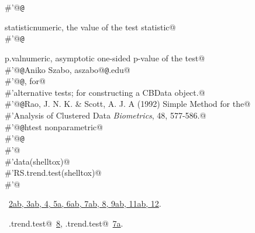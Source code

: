 \documentclass[reqno]{amsart}
\renewcommand{\NWlink}[2]{\hyperlink{#1}{#2}}
\begin{document}
\begin{flushleft}
\begin{list}{}{}
\mbox{}\verb@#'@{\tt @}\verb@return \item{statistic}{numeric, the value of the test statistic}@\\
\mbox{}\verb@#'@{\tt @}\verb@return \item{p.val}{numeric, asymptotic one-sided p-value of the test}@\\
\mbox{}\verb@#'@{\tt @}\verb@author Aniko Szabo, aszabo@{\tt @}\verb@mcw.edu@\\
\mbox{}\verb@#'@{\tt @}\verb@seealso {},  for@\\
\mbox{}\verb@#'alternative tests;  for constructing a CBData object.@\\
\mbox{}\verb@#'@{\tt @}\verb@references Rao, J. N. K. & Scott, A. J. A (1992) Simple Method for the@\\
\mbox{}\verb@#'Analysis of Clustered Data \emph{Biometrics}, 48, 577-586.@\\
\mbox{}\verb@#'@{\tt @}\verb@keywords htest nonparametric@\\
\mbox{}\verb@#'@{\tt @}\verb@examples@\\
\mbox{}\verb@#'@\\
\mbox{}\verb@#'data(shelltox)@\\
\mbox{}\verb@#'RS.trend.test(shelltox)@\\
\mbox{}\verb@#'@\\
\mbox{}\verb@@{\NWsep}
\end{list}
\vspace{-1.5ex}
\footnotesize
\begin{list}{}{\setlength{\itemsep}{-\parsep}\setlength{\itemindent}{-\leftmargin}}
\item \NWtxtFileDefBy\ \NWlink{nuweb2a}{2a}\NWlink{nuweb2b}{b}\NWlink{nuweb3a}{, 3a}\NWlink{nuweb3b}{b}\NWlink{nuweb4}{, 4}\NWlink{nuweb5a}{, 5a}\NWlink{nuweb6a}{, 6a}\NWlink{nuweb6b}{b}\NWlink{nuweb7a}{, 7a}\NWlink{nuweb7b}{b}\NWlink{nuweb8}{, 8}\NWlink{nuweb9a}{, 9a}\NWlink{nuweb9b}{b}\NWlink{nuweb11a}{, 11a}\NWlink{nuweb11b}{b}\NWlink{nuweb12}{, 12}.
\item \NWtxtIdentsUsed\nobreak\  \verb@GEE.trend.test@\nobreak\ \NWlink{nuweb8}{8}, \verb@RS.trend.test@\nobreak\ \NWlink{nuweb7a}{7a}.
\item{}
\end{list}
\vspace{4ex}
\end{flushleft}
\end{document}
